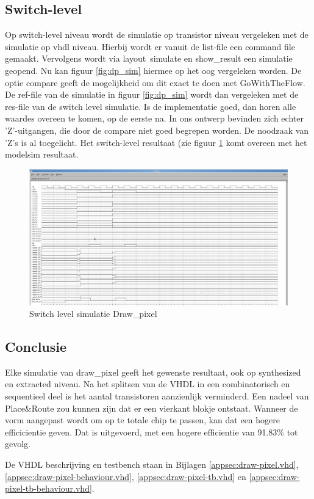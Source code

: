 \documentclass{scrartcl} %
\begin{document}
\subsection{Switch-level}
Op switch-level niveau wordt de simulatie op transistor niveau vergeleken met de simulatie op vhdl niveau. Hierbij wordt er vanuit de list-file een command file gemaakt. Vervolgens wordt via layout\ simulate en show\_result een simulatie geopend. Nu kan figuur \ref{fig:dp_sim} hiermee op het oog vergeleken worden. De optie compare geeft de mogelijkheid om dit exact te doen met GoWithTheFlow. De ref-file van de simulatie in figuur \ref{fig:dp_sim} wordt dan vergeleken met de res-file van de switch level simulatie. Is de implementatie goed, dan horen alle waardes overeen te komen, op de eerste na. In ons ontwerp bevinden zich echter 'Z'-uitgangen, die door de compare niet goed begrepen worden. De noodzaak van 'Z's is al toegelicht. Het switch-level resultaat (zie figuur \ref{fig:dp_sw_lev} komt overeen met het modelsim resultaat.
\begin{figure} [h!]
\centering
\includegraphics [width = \textwidth] {resource/dp_sw_lev-rc}
\caption{Switch level simulatie Draw\_pixel}
\label{fig:dp_sw_lev}
\end{figure}



\subsection{Conclusie}
Elke simulatie van draw\_pixel geeft het gewenste resultaat, ook op synthesized en extracted niveau. Na het splitsen van de VHDL in een combinatorisch en sequentieel deel is het aantal transistoren aanzienlijk verminderd. Een nadeel van Place\&Route zou kunnen zijn dat er een vierkant blokje ontstaat. Wanneer de vorm aangepast wordt om op te totale chip te passen, kan dat een hogere efficicientie geven. Dat is uitgevoerd, met een hogere efficientie van 91.83\% tot gevolg. 

De VHDL beschrijving en testbench staan in Bijlagen \ref{appsec:draw-pixel.vhd}, \ref{appsec:draw-pixel-behaviour.vhd}, \ref{appsec:draw-pixel-tb.vhd} en \ref{appsec:draw-pixel-tb-behaviour.vhd}.
\end{document}
